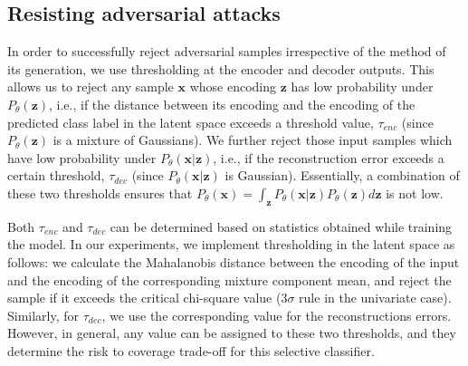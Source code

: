 \documentclass[letterpaper]{article} %
\begin{document}
\subsection{Resisting adversarial attacks}
\label{res_adv_smpls}
In order to successfully reject adversarial samples irrespective of the method of its generation, we use thresholding at the encoder and decoder outputs. This allows us to reject any sample $\mathbf{x}$ whose encoding $\mathbf{z}$ has low probability under $P_\theta(\mathbf{z})$, i.e., if the distance between its encoding and the encoding of the predicted class label in the latent space exceeds a threshold value, $\tau_{enc}$ (since $P_\theta(\mathbf{z})$ is a mixture of Gaussians). We further reject those input samples which have low probability under $P_\theta(\mathbf{x}|\mathbf{z})$, i.e., if the reconstruction error exceeds a certain threshold, $\tau_{dec}$ (since $P_\theta(\mathbf{x}|\mathbf{z})$ is Gaussian). Essentially, a combination of these two thresholds ensures that $P_\theta(\mathbf{x}) = \int_\mathbf{z}P_\theta(\mathbf{x}|\mathbf{z})P_\theta(\mathbf{z})d\mathbf{z}$ is not low.

Both $\tau_{enc}$ and $\tau_{dec}$ can be determined based on statistics obtained while training the model. In our experiments, we implement thresholding in the latent space as follows: we calculate the Mahalanobis distance between the encoding of the input and the encoding of the corresponding mixture component mean, and reject the sample if it exceeds the critical chi-square value ($3\sigma$ rule in the univariate case). Similarly, for $\tau_{dec}$, we use the corresponding value for the reconstructions errors.
However, in general, any value can be assigned to these two thresholds, and they determine the risk to coverage trade-off for this selective classifier.
\end{document}
